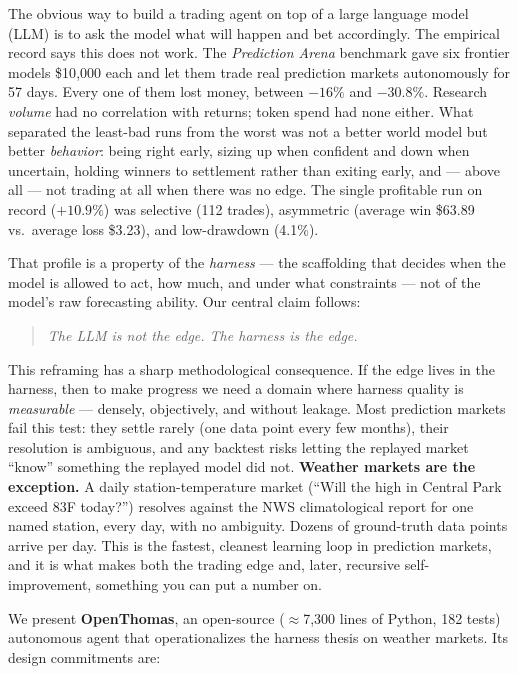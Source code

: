 \documentclass[10pt,twocolumn]{article}
\begin{document}
The obvious way to build a trading agent on top of a large language model (LLM)
is to ask the model what will happen and bet accordingly. The empirical record
says this does not work. The \emph{Prediction Arena} benchmark
\cite{predarena} gave six frontier models \$10{,}000 each and let them trade
real prediction markets autonomously for 57 days. Every one of them lost money,
between $-16\%$ and $-30.8\%$. Research \emph{volume} had no correlation with
returns; token spend had none either. What separated the least-bad runs from the
worst was not a better world model but better \emph{behavior}: being right early,
sizing up when confident and down when uncertain, holding winners to settlement
rather than exiting early, and --- above all --- not trading at all when there
was no edge. The single profitable run on record ($+10.9\%$) was selective (112
trades), asymmetric (average win \$63.89 vs.\ average loss \$3.23), and
low-drawdown (4.1\%).

That profile is a property of the \emph{harness} --- the scaffolding that
decides when the model is allowed to act, how much, and under what constraints
--- not of the model's raw forecasting ability. Our central claim follows:

\begin{quote}
\emph{The LLM is not the edge. The harness is the edge.}
\end{quote}

This reframing has a sharp methodological consequence. If the edge lives in the
harness, then to make progress we need a domain where harness quality is
\emph{measurable} --- densely, objectively, and without leakage. Most prediction
markets fail this test: they settle rarely (one data point every few months),
their resolution is ambiguous, and any backtest risks letting the replayed
market ``know'' something the replayed model did not. \textbf{Weather markets are
the exception.} A daily station-temperature market (``Will the high in Central
Park exceed 83\textdegree F today?'') resolves against the NWS climatological
report for one named station, every day, with no ambiguity. Dozens of
ground-truth data points arrive per day. This is the fastest, cleanest learning
loop in prediction markets, and it is what makes both the trading edge and,
later, recursive self-improvement, something you can put a number on.

We present \textbf{OpenThomas}, an open-source ($\approx$7{,}300 lines of Python,
182 tests) autonomous agent that operationalizes the harness thesis on weather
markets. Its design commitments are:
\end{document}
